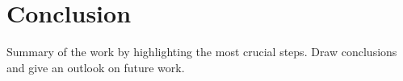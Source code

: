 \chapter{Conclusion}\label{ch:5}

Summary of the work by highlighting the most crucial steps. Draw conclusions and give an outlook on future work.